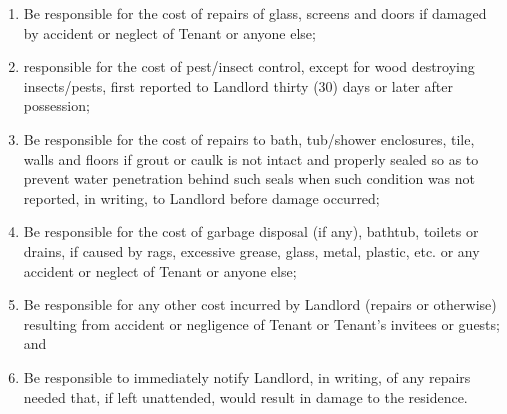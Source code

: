 \documentclass[9pt]{article}
\begin{document}
\begin{enumerate}[label=\roman*)]
		It is further understood, acknowledged and agreed that Tenant shall:
		\item Be responsible for the cost of repairs of glass, screens and doors if damaged by accident or neglect of Tenant or anyone else;
		\item responsible for the cost of pest/insect control, except for wood destroying insects/pests, first reported to Landlord thirty (30) days or later after possession;
		\item Be responsible for the cost of repairs to bath, tub/shower enclosures, tile, walls and floors if grout or caulk is not intact and properly sealed so as to prevent water penetration behind such seals when such condition was not reported, in writing, to Landlord before damage occurred;
		\item Be responsible for the cost of garbage disposal (if any), bathtub, toilets or drains, if caused by rags, excessive grease, glass, metal, plastic, etc. or any accident or neglect of Tenant or anyone else;
		\item Be responsible for any other cost incurred by Landlord (repairs or otherwise) resulting from accident or negligence of Tenant or Tenant's invitees or guests; and
		\item Be responsible to immediately notify Landlord, in writing, of any repairs needed that, if left unattended, would result in damage to the residence.
		

\end{enumerate}
\end{document}
